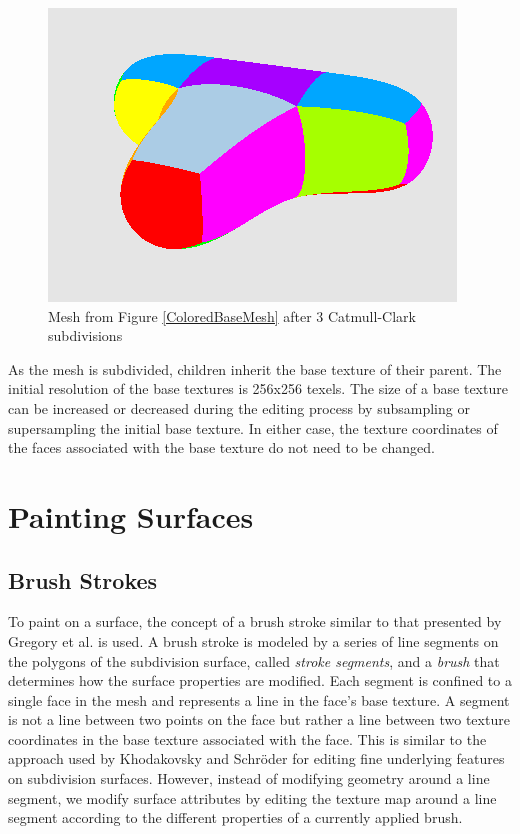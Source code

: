 \documentclass[10pt,twocolumn]{article}
\begin{document}
\begin{figure}
\begin{center}
\includegraphics[scale=0.5]{subdmesh.png}
\caption{Mesh from Figure \ref{ColoredBaseMesh} after 3 Catmull-Clark subdivisions}
\label{ColoredMesh}
\end{center}
\end{figure}


As the mesh is subdivided, children inherit the base texture 
of their parent.  The initial resolution of the base textures is 
256x256 texels.  The size of a base texture can be increased or 
decreased during the editing process by subsampling or supersampling 
the initial base texture. In either case, the texture coordinates
of the faces associated with the base texture do not need to be changed.
 
\section{Painting Surfaces}
\subsection{Brush Strokes}
\label{subsection:BrushStrokes} 
\indent To paint on a surface, the concept of a brush stroke similar to that presented by
Gregory et al. \cite{VR00*45} is used. 
A brush stroke is modeled by a series of line segments on the polygons
of the subdivision surface, called {\em stroke segments}, and a 
{\em brush} that determines how the surface properties are modified. 
Each segment is confined to a single face in the mesh and represents 
a line in the face's base texture. 
A segment is not a line between two points on the face but rather a line 
between two texture coordinates in the base texture associated with the face. 
This is similar to the approach used by Khodakovsky and Schr{\"o}der 
\cite{SSMA99*203} for editing fine underlying features on subdivision surfaces. 
However, instead of modifying geometry around a line segment, we modify surface attributes by
editing the texture map around a line segment according to the different properties of
a currently applied brush.
\end{document}

